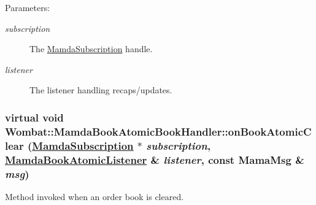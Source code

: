 \begin{Desc}
\item[Parameters:]
\begin{description}
\item[{\em subscription}]The \hyperlink{classWombat_1_1MamdaSubscription}{Mamda\-Subscription} handle. \item[{\em listener}]The listener handling recaps/updates. \end{description}
\end{Desc}
\hypertarget{classWombat_1_1MamdaBookAtomicBookHandler_8afec13e558087d9b3ef2deae8ec7eff}{
\subsubsection[onBookAtomicClear]{\setlength{\rightskip}{0pt plus 5cm}virtual void Wombat::Mamda\-Book\-Atomic\-Book\-Handler::on\-Book\-Atomic\-Clear (\hyperlink{classWombat_1_1MamdaSubscription}{Mamda\-Subscription} $\ast$ {\em subscription}, \hyperlink{classWombat_1_1MamdaBookAtomicListener}{Mamda\-Book\-Atomic\-Listener} \& {\em listener}, const Mama\-Msg \& {\em msg})}}
\label{classWombat_1_1MamdaBookAtomicBookHandler_8afec13e558087d9b3ef2deae8ec7eff}


Method invoked when an order book is cleared. 

